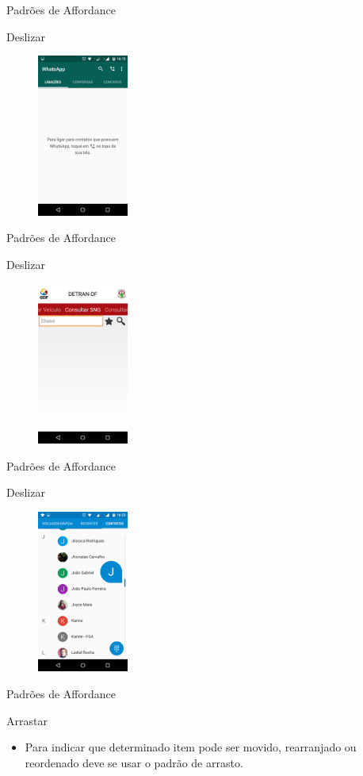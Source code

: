 \begin{frame}{Padrões de Affordance}
\begin{block}{Deslizar}
    \begin{figure}
    \includegraphics[width=3cm]{figuras/deslize/deslize1}
    \end{figure}
\end{block}
\end{frame}

\begin{frame}{Padrões de Affordance}
\begin{block}{Deslizar}
    \begin{figure}
    \includegraphics[width=3cm]{figuras/deslize/deslize6}
    \end{figure}
\end{block}
\end{frame}

\begin{frame}{Padrões de Affordance}
\begin{block}{Deslizar}
    \begin{figure}
    \includegraphics[width=3cm]{figuras/deslize/deslize5}
    \end{figure}
\end{block}
\end{frame}

\begin{frame}{Padrões de Affordance}
\begin{block}{Arrastar}
  \begin{itemize}
    \item<1-> Para indicar que determinado item pode ser movido, rearranjado ou reordenado deve se usar o padrão de arrasto.
  \end{itemize}
\end{block}
\end{frame}
